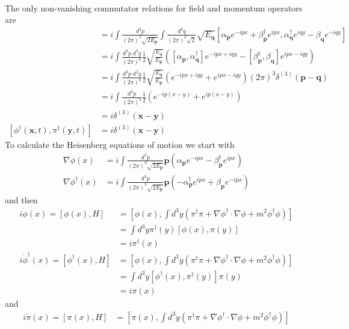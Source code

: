 \documentclass[10pt,a4paper]{book}
\theoremstyle{definition}
\begin{document}
\begin{enumerate}[(a)]
\begin{align}
\end{align}
The only non-vanishing commutator relations for field and momentum operators are
\begin{align}
[\phi(\mathbf{x},t),\pi(\mathbf{y},t)]&=i\int\frac{d^3p}{(2\pi)^3\sqrt{2E_\mathbf{p}}}\int\frac{d^3q}{(2\pi)^3\sqrt{2}}\sqrt{E_\mathbf{q}}[\alpha_\mathbf{p}e^{-ipx}+\beta^\dagger_\mathbf{p} e^{ipx},\alpha^\dagger_\mathbf{q}e^{iqy}-\beta_\mathbf{q} e^{-iqy}]\\
&=i\int\frac{d^3p\;d^3q}{(2\pi)^6}\frac{1}{2}\sqrt{\frac{E_\mathbf{q}}{E_\mathbf{p}}}([\alpha_\mathbf{p},\alpha^\dagger_\mathbf{q}]e^{-ipx+iqy}-[\beta^\dagger_\mathbf{p},\beta_\mathbf{q}]e^{ipx-iqy})\\
&=i\int\frac{d^3p\;d^3q}{(2\pi)^6}\frac{1}{2}\sqrt{\frac{E_\mathbf{q}}{E_\mathbf{p}}}(e^{-ipx+iqy}+e^{ipx-iqy})(2\pi)^3\delta^{(3)}(\mathbf{p}-\mathbf{q})\\
&=i\int\frac{d^3p}{(2\pi)^3}\frac{1}{2}(e^{-ip(x-y)}+e^{ip(x-y)})\\
&=i\delta^{(3)}(\mathbf{x}-\mathbf{y})\\
[\phi^\dagger(\mathbf{x},t),\pi^\dagger(\mathbf{y},t)]
&=i\delta^{(3)}(\mathbf{x}-\mathbf{y})
\end{align}
To calculate the Heisenberg equations of motion we start with
\begin{align}
\nabla\phi(x)
&=i\int\frac{d^3p}{(2\pi)^3\sqrt{2E_\mathbf{p}}}\mathbf{p}\left(\alpha_\mathbf{p}e^{-ipx}-\beta^\dagger_\mathbf{p} e^{ipx}\right)\\
\nabla\phi^\dagger(x)
&=i\int\frac{d^3p}{(2\pi)^3\sqrt{2E_\mathbf{p}}}\mathbf{p}\left(-\alpha^\dagger_\mathbf{p}e^{ipx}+\beta_\mathbf{p}e^{-ipx}\right)
\end{align}
and then
\begin{align}
i\dot{\phi}(x)=[\phi(x),H]
&=\left[\phi(x),\int d^3y(\pi^\dagger\pi+\nabla\phi^\dagger\cdot\nabla\phi+m^2\phi^\dagger\phi)\right]\\
&=\int d^3y\pi^\dagger(y)[\phi(x),\pi(y)]\\
&=i\pi^\dagger(x)\\
i\dot{\phi}^\dagger(x)=[\phi^\dagger(x),H]
&=\left[\phi(x),\int d^3y(\pi^\dagger\pi+\nabla\phi^\dagger\cdot\nabla\phi+m^2\phi^\dagger\phi)\right]\\
&=\int d^3y[\phi^\dagger(x),\pi^\dagger(y)]\pi(y)\\
&=i\pi(x)
\end{align}
and 
\begin{align}
i\dot{\pi}(x)=[\pi(x),H]
&=\left[\pi(x),\int d^3y(\pi^\dagger\pi+\nabla\phi^\dagger\cdot\nabla\phi+m^2\phi^\dagger\phi)\right]\\

\end{align}
\end{enumerate}
\end{document}
